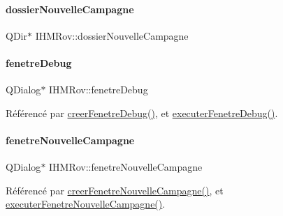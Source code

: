 \paragraph{\texorpdfstring{dossier\+Nouvelle\+Campagne}{dossierNouvelleCampagne}}
{\footnotesize\ttfamily Q\+Dir$\ast$ I\+H\+M\+Rov\+::dossier\+Nouvelle\+Campagne\hspace{0.3cm}{\ttfamily [private]}}

\mbox{\label{class_i_h_m_rov_a393d23f9256a9db063dfef11d95cdc06}} 
\paragraph{\texorpdfstring{fenetre\+Debug}{fenetreDebug}}
{\footnotesize\ttfamily Q\+Dialog$\ast$ I\+H\+M\+Rov\+::fenetre\+Debug\hspace{0.3cm}{\ttfamily [private]}}



Référencé par \hyperlink{class_i_h_m_rov_a30b49bada719a73e0899ad4bafb4de99}{creer\+Fenetre\+Debug()}, et \hyperlink{class_i_h_m_rov_a8931cade7a1613975da7174b5c2e84d2}{executer\+Fenetre\+Debug()}.

\mbox{\label{class_i_h_m_rov_a13c12a93de7fc77c32f0108ae73cec06}} 
\paragraph{\texorpdfstring{fenetre\+Nouvelle\+Campagne}{fenetreNouvelleCampagne}}
{\footnotesize\ttfamily Q\+Dialog$\ast$ I\+H\+M\+Rov\+::fenetre\+Nouvelle\+Campagne\hspace{0.3cm}{\ttfamily [private]}}



Référencé par \hyperlink{class_i_h_m_rov_a08bf623a890df272f738c1ff8631213f}{creer\+Fenetre\+Nouvelle\+Campagne()}, et \hyperlink{class_i_h_m_rov_a3169e8cd9132ece69af974648066c6c1}{executer\+Fenetre\+Nouvelle\+Campagne()}.

\mbox{\label{class_i_h_m_rov_a277956dfb79e5345e5ae0117fe41ddf2}} 

